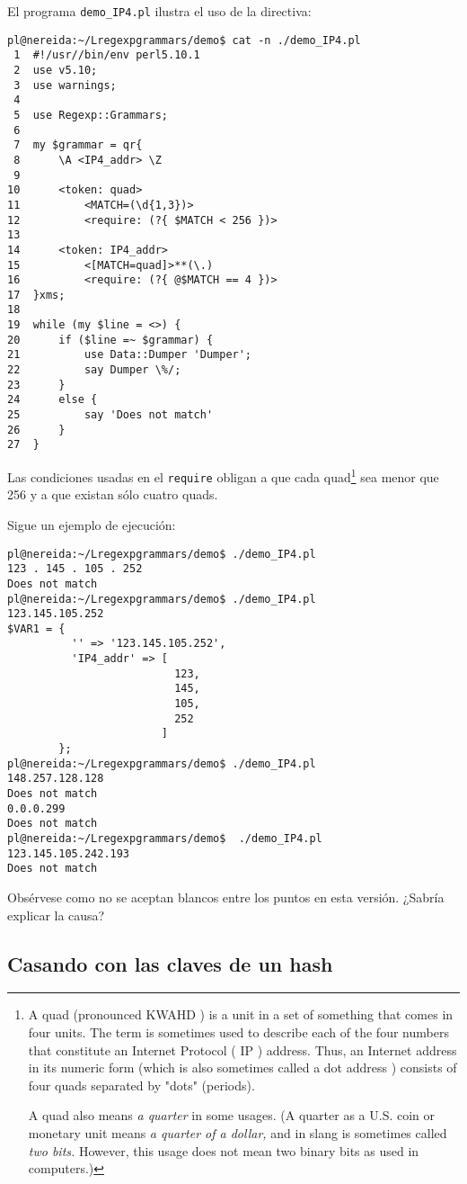 El programa \verb|demo_IP4.pl| ilustra el uso de la directiva:
\begin{verbatim}
pl@nereida:~/Lregexpgrammars/demo$ cat -n ./demo_IP4.pl
 1  #!/usr//bin/env perl5.10.1
 2  use v5.10;
 3  use warnings;
 4
 5  use Regexp::Grammars;
 6
 7  my $grammar = qr{
 8      \A <IP4_addr> \Z
 9
10      <token: quad>
11          <MATCH=(\d{1,3})>
12          <require: (?{ $MATCH < 256 })>
13
14      <token: IP4_addr>
15          <[MATCH=quad]>**(\.)
16          <require: (?{ @$MATCH == 4 })>
17  }xms;
18
19  while (my $line = <>) {
20      if ($line =~ $grammar) {
21          use Data::Dumper 'Dumper';
22          say Dumper \%/;
23      }
24      else {
25          say 'Does not match'
26      }
27  }
\end{verbatim}
Las condiciones usadas en el \verb|require| obligan a que cada 
quad\footnote{
A quad (pronounced KWAHD ) is a unit in a set of something that comes
in four units. The term is sometimes used to describe each of the four
numbers that constitute an Internet Protocol ( IP ) address. Thus, an
Internet address in its numeric form (which is also sometimes called a
dot address ) consists of four quads separated by "dots" (periods). 

A quad also means \emph{a quarter} in some usages. (A quarter as a U.S. coin
or monetary unit means \emph{a quarter of a dollar,} and in slang is sometimes
called \emph{two bits.} However, this usage does not mean two binary bits as
used in computers.)
} sea menor que 256 y a que existan sólo cuatro quads.

Sigue un ejemplo de ejecución:
\begin{verbatim}
pl@nereida:~/Lregexpgrammars/demo$ ./demo_IP4.pl
123 . 145 . 105 . 252
Does not match
pl@nereida:~/Lregexpgrammars/demo$ ./demo_IP4.pl
123.145.105.252
$VAR1 = {
          '' => '123.145.105.252',
          'IP4_addr' => [
                          123,
                          145,
                          105,
                          252
                        ]
        };
pl@nereida:~/Lregexpgrammars/demo$ ./demo_IP4.pl
148.257.128.128
Does not match
0.0.0.299
Does not match
pl@nereida:~/Lregexpgrammars/demo$  ./demo_IP4.pl
123.145.105.242.193
Does not match
\end{verbatim}
Obsérvese como no se aceptan blancos entre los puntos en esta versión.
¿Sabría explicar la causa?



\subsection{Casando con las claves de un hash}


